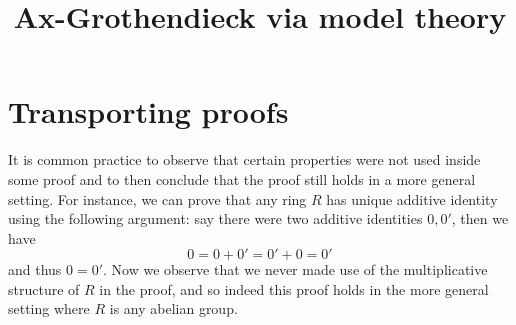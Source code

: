 \documentclass[12pt]{article}
\title{Ax-Grothendieck via model theory}
\theoremstyle{plain}
\theoremstyle{definition}
\begin{document}
	\maketitle
	
	\section{Transporting proofs}
	It is common practice to observe that certain properties were not used inside some proof and to then conclude that the proof still holds in a more general setting. For instance, we can prove that any ring $R$ has unique additive identity using the following argument: say there were two additive identities $0,0'$, then we have
	\begin{equation}
		0 = 0 + 0' = 0' + 0 = 0'
		\end{equation}
	and thus $0 = 0'$. Now we observe that we never made use of the multiplicative structure of $R$ in the proof, and so indeed this proof holds in the more general setting where $R$ is any abelian group.
	
\end{document}
